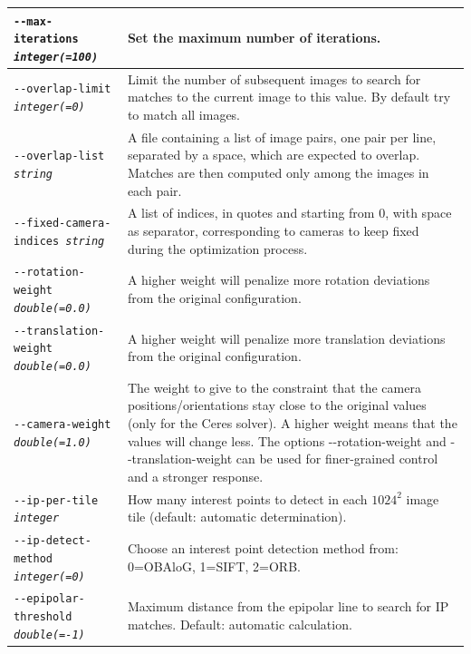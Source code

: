 \begin{longtable}{|l|p{8.0cm}|}
\texttt{-\/-max-iterations \textit{integer(=100)}} & Set the maximum
number of iterations. \\ \hline

\texttt{-\/-overlap-limit \textit{integer(=0)}} & Limit the number of
subsequent images to search for matches to the current image to this
value.  By default try to match all images.\\ \hline

\texttt{-\/-overlap-list \textit{string}} & A file containing a list of image pairs, one pair per line, separated by a space, which are expected to overlap. Matches are then computed only among the images in each pair.
\\ \hline

\texttt{-\/-fixed-camera-indices \textit{string}} & A list of indices, in quotes and starting from 0, with space as separator, corresponding to cameras to keep fixed during the optimization process.
\\ \hline

\texttt{-\/-rotation-weight \textit{double(=0.0)}} &
A higher weight will penalize more rotation deviations from the original configuration.
\\ \hline

\texttt{-\/-translation-weight \textit{double(=0.0)}} &
A higher weight will penalize more translation deviations from the original configuration.
\\ \hline

\texttt{-\/-camera-weight \textit{double(=1.0)}} &
The weight to give to the constraint that the camera positions/orientations stay close to
the original values (only for the Ceres solver).  A higher weight means that the values will
change less.  The options -\/-rotation-weight and -\/-translation-weight can be used for finer-grained control and a stronger response.
\\ \hline

\texttt{-\/-ip-per-tile \textit{integer}} &
How many interest points to detect in each $1024^2$ image tile (default: automatic
determination).
\\ \hline

\texttt{-\/-ip-detect-method \textit{integer(=0)}} & Choose an interest point
detection method from: 0=OBAloG, 1=SIFT, 2=ORB. \\ \hline

\texttt{-\/-epipolar-threshold \textit{double(=-1)}} & 
Maximum distance from the epipolar line to search for IP matches. Default: automatic calculation.
\\ \hline


\end{longtable}
